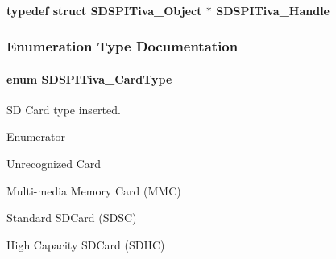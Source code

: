 \paragraph[{S\-D\-S\-P\-I\-Tiva\-\_\-\-Handle}]{\setlength{\rightskip}{0pt plus 5cm}typedef struct {\bf S\-D\-S\-P\-I\-Tiva\-\_\-\-Object} $\ast$ {\bf S\-D\-S\-P\-I\-Tiva\-\_\-\-Handle}}\label{_s_d_s_p_i_tiva_8h_ac351c9ecad35997bc63232591cc2f13e}


\subsubsection{Enumeration Type Documentation}
\paragraph[{S\-D\-S\-P\-I\-Tiva\-\_\-\-Card\-Type}]{\setlength{\rightskip}{0pt plus 5cm}enum {\bf S\-D\-S\-P\-I\-Tiva\-\_\-\-Card\-Type}}\label{_s_d_s_p_i_tiva_8h_a735a3f0fb087ca4e97c2e43ed68b1a0a}


S\-D Card type inserted. 

\begin{Desc}
\item[Enumerator]\par
\begin{description}
\item[{\em 
N\-O\-C\-A\-R\-D\label{_s_d_s_p_i_tiva_8h_a735a3f0fb087ca4e97c2e43ed68b1a0aa422cdc20ba86c8cdcf1f0fd2318a1cfc}
}]Unrecognized Card \item[{\em 
M\-M\-C\label{_s_d_s_p_i_tiva_8h_a735a3f0fb087ca4e97c2e43ed68b1a0aaa7d8fca3406f36682514f0384d910fac}
}]Multi-\/media Memory Card (M\-M\-C) \item[{\em 
S\-D\-S\-C\label{_s_d_s_p_i_tiva_8h_a735a3f0fb087ca4e97c2e43ed68b1a0aa87550a2102744c14e5e2e0ed39cc04b2}
}]Standard S\-D\-Card (S\-D\-S\-C) \item[{\em 
S\-D\-H\-C\label{_s_d_s_p_i_tiva_8h_a735a3f0fb087ca4e97c2e43ed68b1a0aab27db2a19a825c3e6f1513cdab7c81ea}
}]High Capacity S\-D\-Card (S\-D\-H\-C) \end{description}
\end{Desc}


